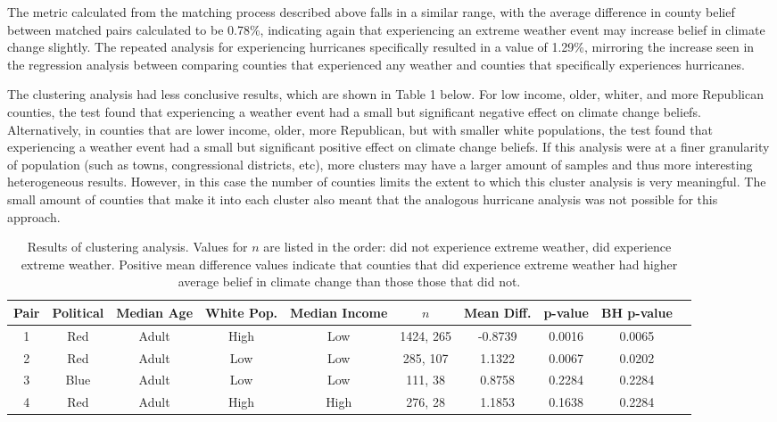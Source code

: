 \documentclass{article}
\begin{document}
The metric calculated from the matching process described above falls in a similar range, with the average difference in county belief between matched pairs calculated to be 0.78\%, indicating again that experiencing an extreme weather event may increase belief in climate change slightly. The repeated analysis for experiencing hurricanes specifically resulted in a value of 1.29\%, mirroring the increase seen in the regression analysis between comparing counties that experienced any weather and counties that specifically experiences hurricanes.

The clustering analysis had less conclusive results, which are shown in Table 1 below. For low income, older, whiter, and more Republican counties, the test found that experiencing a weather event had a small but significant negative effect on climate change beliefs. Alternatively, in counties that are lower income, older, more Republican, but with smaller white populations, the test found that experiencing a weather event had a small but significant positive effect on climate change beliefs. If this analysis were at a finer granularity of population (such as towns, congressional districts, etc), more clusters may have a larger amount of samples and thus more interesting heterogeneous results. However, in this case the number of counties limits the extent to which this cluster analysis is very meaningful. The small amount of counties that make it into each cluster also meant that the analogous hurricane analysis was not possible for this approach.  

\begin{center}
\begin{table}
\begin{tabular}{| c | c | c | c | c | c | c | c | c | c ||}
\hline
Pair & Political & Median Age & White Pop. & Median Income & $n$ & Mean Diff. & p-value & BH p-value \\ [0.5ex]
\hline
\hline
1 & Red & Adult & High & Low & 1424, 265 & -0.8739 & 0.0016 & 0.0065 \\
\hline
2 & Red & Adult & Low & Low & 285, 107 & 1.1322 & 0.0067 & 0.0202 \\
\hline
3 & Blue & Adult & Low & Low & 111, 38 & 0.8758 & 0.2284 & 0.2284 \\
\hline
4 & Red & Adult & High & High & 276, 28 & 1.1853 & 0.1638 & 0.2284 \\
\hline
\end{tabular}
\caption{Results of clustering analysis. Values for $n$ are listed in the order: did not experience extreme weather, did experience extreme weather. Positive mean difference values indicate that counties that did experience extreme weather had higher average belief in climate change than those those that did not.}
\end{table}
\end{center}
\end{document}
